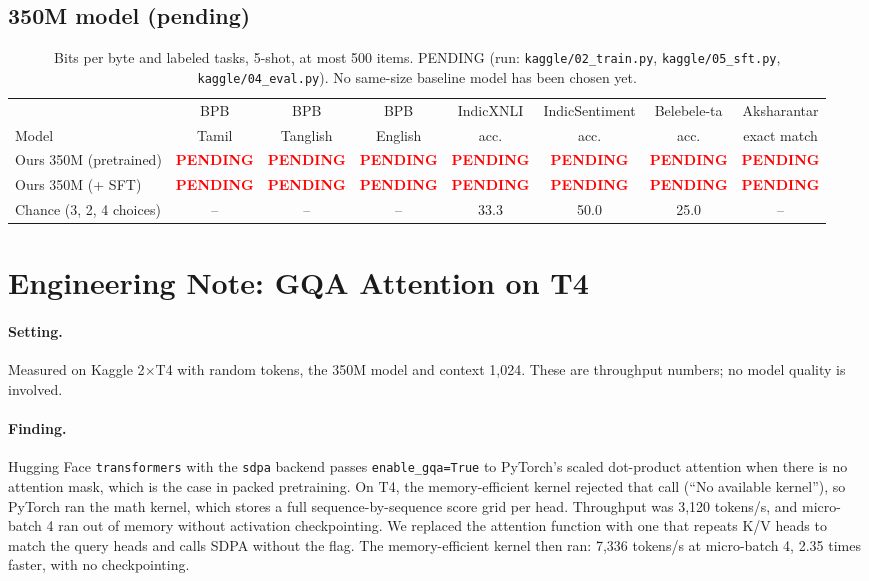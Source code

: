 \documentclass[11pt]{article}
\newcommand{\pending}{\textcolor{red}{\textbf{PENDING}}}
\begin{document}
\subsection{350M model (pending)}
\begin{table}[t]
\centering
\small
\begin{tabular}{lccccccc}
\toprule
 & BPB & BPB & BPB & IndicXNLI & IndicSentiment & Belebele-ta & Aksharantar \\
Model & Tamil & Tanglish & English & acc. & acc. & acc. & exact match \\
\midrule
Ours 350M (pretrained) & \pending & \pending & \pending & \pending & \pending & \pending & \pending \\
Ours 350M (+ SFT) & \pending & \pending & \pending & \pending & \pending & \pending & \pending \\
Chance (3, 2, 4 choices) & -- & -- & -- & 33.3 & 50.0 & 25.0 & -- \\
\bottomrule
\end{tabular}
\caption{Bits per byte and labeled tasks, 5-shot, at most 500 items. PENDING (run: \texttt{kaggle/02\_train.py}, \texttt{kaggle/05\_sft.py}, \texttt{kaggle/04\_eval.py}). No same-size baseline model has been chosen yet.}
\label{tab:model}
\end{table}

\section{Engineering Note: GQA Attention on T4}
\label{sec:eng}

\paragraph{Setting.}
Measured on Kaggle 2$\times$T4 with random tokens, the 350M model and context 1,024.
These are throughput numbers; no model quality is involved.

\paragraph{Finding.}
Hugging Face \texttt{transformers} with the \texttt{sdpa} backend passes \texttt{enable\_gqa=True} to PyTorch's scaled dot-product attention when there is no attention mask, which is the case in packed pretraining.
On T4, the memory-efficient kernel rejected that call (``No available kernel''), so PyTorch ran the math kernel, which stores a full sequence-by-sequence score grid per head.
Throughput was 3,120 tokens/s, and micro-batch 4 ran out of memory without activation checkpointing.
We replaced the attention function with one that repeats K/V heads to match the query heads and calls SDPA without the flag.
The memory-efficient kernel then ran: 7,336 tokens/s at micro-batch 4, 2.35 times faster, with no checkpointing.
\end{document}
